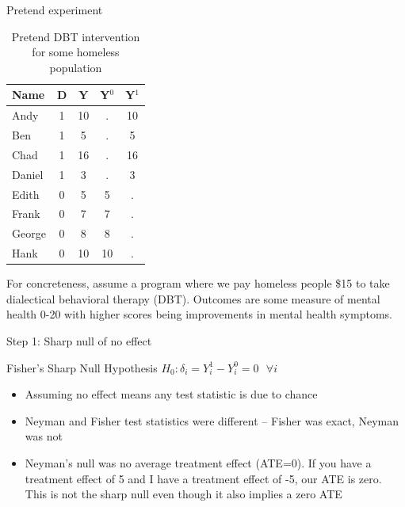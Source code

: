 \documentclass{beamer}
\begin{document}
\begin{frame}{Pretend experiment}

\begin{table}[htbp]\centering
\begin{center}
\caption{Pretend DBT intervention for some homeless population}
\begin{threeparttable}
\begin{tabular}{lcccc}
\toprule
\multicolumn{1}{l}{Name}&
\multicolumn{1}{c}{D}&
\multicolumn{1}{c}{Y}&
\multicolumn{1}{c}{Y$^0$}&
\multicolumn{1}{c}{Y$^1$}\\
\midrule
Andy		& 1 & 10  & . & 10 \\
Ben		& 1 & 5    & . & 5 \\
Chad	& 1 & 16  & . & 16 \\	
Daniel	& 1 &  3   & . & 3 \\
Edith		& 0 & 5    & 5 & . \\
Frank	& 0 & 7    & 7&.  \\
George	& 0 & 8    & 8 & . \\
Hank		& 0 & 10  & 10 & . \\
\bottomrule
\end{tabular}
\end{threeparttable}
\end{center}
\end{table}

For concreteness, assume a program where we pay homeless people \$15 to take dialectical behavioral therapy (DBT). Outcomes are some measure of mental health 0-20 with higher scores being improvements in mental health symptoms. 
	
\end{frame}



\begin{frame}{Step 1: Sharp null of no effect}

\begin{block}{Fisher's Sharp Null Hypothesis}
$H_0: \delta_i = Y_i^1 - Y_i^0 = 0 \text{ } \forall i$
\end{block}

\begin{itemize}
\item Assuming no effect means any test statistic is due to chance
\item Neyman and Fisher test statistics were different -- Fisher was exact, Neyman was not
\item Neyman's null was no average treatment effect (ATE=0). If you have a treatment effect of 5 and I have a treatment effect of -5, our ATE is zero. This is not the sharp null even though it also implies a zero ATE

\end{itemize}

\end{frame}
\end{document}
